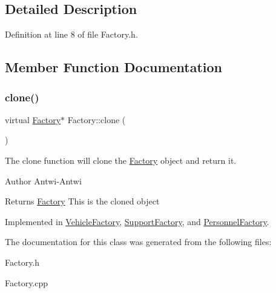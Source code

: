 \subsection{Detailed Description}


Definition at line 8 of file Factory.\+h.



\subsection{Member Function Documentation}
\mbox{\label{classFactory_a00881ec5050751e4b747db5dfd266192}} 
\subsubsection{\texorpdfstring{clone()}{clone()}}
{\footnotesize\ttfamily virtual \hyperlink{classFactory}{Factory}$\ast$ Factory\+::clone (\begin{DoxyParamCaption}{ }\end{DoxyParamCaption})\hspace{0.3cm}{\ttfamily [pure virtual]}}



The clone function will clone the \hyperlink{classFactory}{Factory} object and return it. 

\begin{DoxyAuthor}{Author}
Antwi-\/\+Antwi 
\end{DoxyAuthor}
\begin{DoxyReturn}{Returns}
\hyperlink{classFactory}{Factory} This is the cloned object 
\end{DoxyReturn}


Implemented in \hyperlink{classVehicleFactory_a6d874e37b573b491a49e303209ac42cd}{Vehicle\+Factory}, \hyperlink{classSupportFactory_a802c25e901b479656ea95a5678a1ad26}{Support\+Factory}, and \hyperlink{classPersonnelFactory_ad60e8371e52153294112b16a7a97cc2d}{Personnel\+Factory}.



The documentation for this class was generated from the following files\+:\begin{DoxyCompactItemize}
\item 
Factory.\+h\item 
Factory.\+cpp\end{DoxyCompactItemize}
